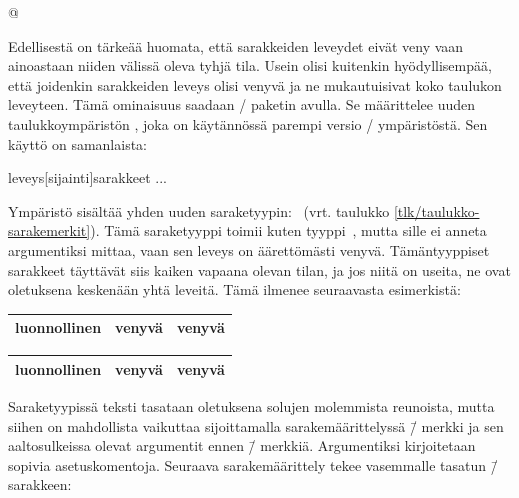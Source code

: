 \begin{koodilohkosis}
@{\extracolsep{\fill}}
\end{koodilohkosis}

\noindent
Edellisestä on tärkeää huomata, että sarakkeiden leveydet eivät veny
vaan ainoastaan niiden välissä oleva tyhjä tila. Usein olisi kuitenkin
hyödyllisempää, että joidenkin sarakkeiden leveys olisi venyvä ja ne
mukautuisivat koko taulukon leveyteen. Tämä ominaisuus saadaan
\-/ paketin avulla. Se määrittelee uuden
taulukkoympäristön , joka on käytännössä parempi
versio \-/ ympäristöstä. Sen käyttö on samanlaista:

\begin{koodilohkosis}
\begin{tabularx}{leveys}[sijainti]{sarakkeet}
  ...
\end{tabularx}
\end{koodilohkosis}

\noindent
Ympäristö  sisältää yhden uuden
saraketyypin:~ (vrt. taulukko \ref{tlk/taulukko-sarakemerkit}).
Tämä saraketyyppi toimii kuten tyyppi~, mutta sille ei anneta
argumentiksi mittaa, vaan sen leveys on äärettömästi venyvä.
Tämäntyyppiset sarakkeet täyttävät siis kaiken vapaana olevan tilan, ja
jos niitä on useita, ne ovat oletuksena keskenään yhtä leveitä. Tämä
ilmenee seuraavasta esimerkistä:

\begin{koodilohkosis}
\begin{tabularx}{\linewidth}{|l|X|X|}
  \hline luonnollinen & venyvä & venyvä \\ \hline
\end{tabularx}
\end{koodilohkosis}

\begin{tulossis}
  \renewcommand{\arraystretch}{1.2}
  \begin{tabularx}{\linewidth}{|l|X|X|}
    \hline luonnollinen & venyvä & venyvä \\ \hline
  \end{tabularx}
\end{tulossis}

\noindent
Saraketyypissä  teksti tasataan oletuksena solujen
molemmista reunoista, mutta siihen on mahdollista vaikuttaa
sijoittamalla sarakemäärittelyssä \koodi{>}\=/ merkki ja sen
aaltosulkeissa olevat argumentit ennen \=/ merkkiä.
Argumentiksi kirjoitetaan sopivia asetuskomentoja. Seuraava
sarakemäärittely tekee vasemmalle tasatun \=/ sarakkeen:

